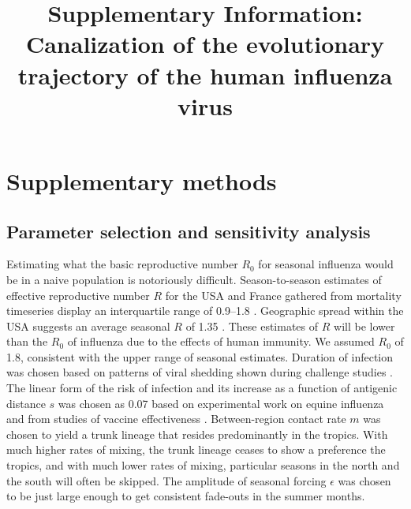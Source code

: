 \setcounter{figure}{0}
\setcounter{table}{0}
\setcounter{page}{1}
\renewcommand{\thefigure}{Supp.~Fig.~\arabic{figure}}
\renewcommand{\thetable}{Supp.~Table~\arabic{table}}
\renewcommand{\thepage}{S\arabic{page}}
  
\title{\Large \bf Supplementary Information: Canalization of the evolutionary trajectory of the human influenza virus}
\maketitle

\section*{Supplementary methods}

\subsection*{Parameter selection and sensitivity analysis}

Estimating what the basic reproductive number $R_0$ for seasonal influenza would be in a naive population is notoriously difficult.  Season-to-season estimates of effective reproductive number $R$ for the USA and France gathered from mortality timeseries display an interquartile range of 0.9--1.8 \cite{Chowell08}.  Geographic spread within the USA suggests an average seasonal $R$ of 1.35 \cite{Viboud06}.  These estimates of $R$ will be lower than the $R_0$ of influenza due to the effects of human immunity.  We assumed $R_0$ of 1.8, consistent with the upper range of seasonal estimates.  Duration of infection was chosen based on patterns of viral shedding shown during challenge studies \cite{Carrat08}.  The linear form of the risk of infection and its increase as a function of antigenic distance $s$ was chosen as 0.07 based on experimental work on equine influenza \cite{Park09} and from studies of vaccine effectiveness \cite{Gupta06}.  Between-region contact rate $m$ was chosen to yield a trunk lineage that resides predominantly in the tropics.  With much higher rates of mixing, the trunk lineage ceases to show a preference the tropics, and with much lower rates of mixing, particular seasons in the north and the south will often be skipped.  The amplitude of seasonal forcing $\epsilon$ was chosen to be just large enough to get consistent fade-outs in the summer months.

